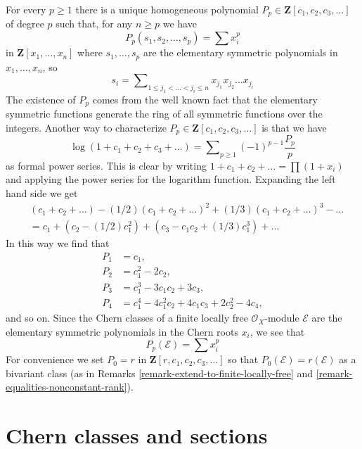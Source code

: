 \begin{example}
\label{example-power-sum}
For every $p \geq 1$ there is a unique homogeneous polynomial
$P_p \in \mathbf{Z}[c_1, c_2, c_3, \ldots]$ of degree $p$
such that, for any $n \geq p$ we have
$$
P_p(s_1, s_2, \ldots, s_p) = \sum x_i^p
$$
in $\mathbf{Z}[x_1, \ldots, x_n]$ where $s_1, \ldots, s_p$ are the
elementary symmetric polynomials in $x_1, \ldots, x_n$, so
$$
s_i = \sum\nolimits_{1 \leq j_1 < \ldots < j_i \leq n}
x_{j_1}x_{j_2} \ldots x_{j_i}
$$
The existence of $P_p$ comes from the well known fact that
the elementary symmetric functions generate the ring of
all symmetric functions over the integers. Another way to
characterize $P_p \in \mathbf{Z}[c_1, c_2, c_3, \ldots]$ is that we have
$$
\log(1 + c_1 + c_2 + c_3 + \ldots) =
\sum\nolimits_{p \geq 1} (-1)^{p - 1}\frac{P_p}{p}
$$
as formal power series. This is clear by writing
$1 + c_1 + c_2 + \ldots = \prod (1 + x_i)$ and applying
the power series for the logarithm function. Expanding the left
hand side we get
\begin{align*}
& (c_1 + c_2 + \ldots) - (1/2)(c_1 + c_2 + \ldots)^2 +
(1/3)(c_1 + c_2 + \ldots)^3 - \ldots \\
& =
c_1 + (c_2 - (1/2)c_1^2) + (c_3 - c_1c_2 + (1/3)c_1^3) + \ldots
\end{align*}
In this way we find that
\begin{align*}
P_1 & = c_1, \\
P_2 & = c_1^2 - 2c_2, \\
P_3 & = c_1^3 - 3c_1c_2 + 3c_3, \\
P_4 & = c_1^4 - 4c_1^2c_2 + 4c_1c_3 + 2c_2^2 - 4c_4,
\end{align*}
and so on. Since the Chern classes of a finite locally free
$\mathcal{O}_X$-module $\mathcal{E}$ are the elementary symmetric
polynomials in the Chern roots $x_i$, we see that
$$
P_p(\mathcal{E}) = \sum x_i^p
$$
For convenience we set $P_0 = r$ in $\mathbf{Z}[r, c_1, c_2, c_3, \ldots]$
so that $P_0(\mathcal{E}) = r(\mathcal{E})$ as a bivariant class
(as in Remarks \ref{remark-extend-to-finite-locally-free} and
\ref{remark-equalities-nonconstant-rank}).
\end{example}






\section{Chern classes and sections}
\label{section-top-chern-class}


